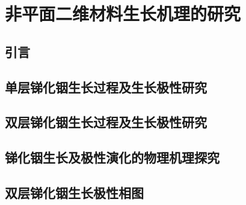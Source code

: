 \chapter{非平面二维材料生长机理的研究}
\section{引言}
\section{单层锑化铟生长过程及生长极性研究}
\section{双层锑化铟生长过程及生长极性研究}
\section{锑化铟生长及极性演化的物理机理探究}
\section{双层锑化铟生长极性相图}